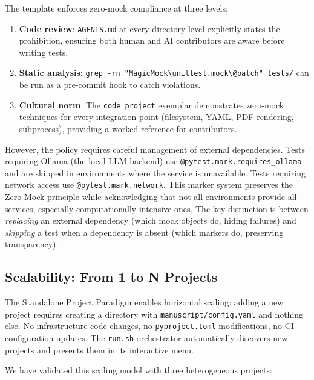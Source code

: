\documentclass[
]{article}
\providecommand{\tightlist}{%
  \setlength{\itemsep}{0pt}\setlength{\parskip}{0pt}}
\begin{document}
The template enforces zero-mock compliance at three levels:

\begin{enumerate}
\def\labelenumi{\arabic{enumi}.}
\tightlist
\item
  \textbf{Code review}: \texttt{AGENTS.md} at every directory level
  explicitly states the prohibition, ensuring both human and AI
  contributors are aware before writing tests.
\item
  \textbf{Static analysis}:
  \texttt{grep\ -rn\ "MagicMock\textbackslash{}\mid{}unittest.mock\textbackslash{}\mid{}@patch"\ tests/}
  can be run as a pre-commit hook to catch violations.
\item
  \textbf{Cultural norm}: The \texttt{code\_project} exemplar
  demonstrates zero-mock techniques for every integration point
  (filesystem, YAML, PDF rendering, subprocess), providing a worked
  reference for contributors.
\end{enumerate}

However, the policy requires careful management of external
dependencies. Tests requiring Ollama (the local LLM backend) use
\texttt{@pytest.mark.requires\_ollama} and are skipped in environments
where the service is unavailable. Tests requiring network access use
\texttt{@pytest.mark.network}. This marker system preserves the
Zero-Mock principle while acknowledging that not all environments
provide all services, especially computationally intensive ones. The key
distinction is between \emph{replacing} an external dependency (which
mock objects do, hiding failures) and \emph{skipping} a test when a
dependency is absent (which markers do, preserving transparency).

\newpage

\subsection{Scalability: From 1 to N
Projects}\label{scalability-from-1-to-n-projects}

The Standalone Project Paradigm enables horizontal scaling: adding a new
project requires creating a directory with
\texttt{manuscript/config.yaml} and nothing else. No infrastructure code
changes, no \texttt{pyproject.toml} modifications, no CI configuration
updates. The \texttt{run.sh} orchestrator automatically discovers new
projects and presents them in its interactive menu.

We have validated this scaling model with three heterogeneous projects:
\end{document}
